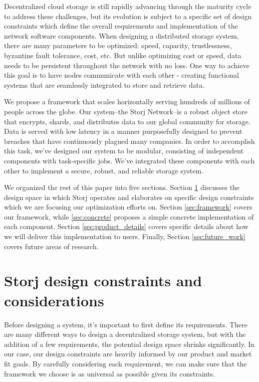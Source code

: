 \documentclass[11pt,fleqn,openany]{book}
\begin{document}
Decentralized cloud storage is still rapidly advancing through the maturity
cycle to address these challenges, but its evolution
is subject to a specific set of design constraints which
define the overall requirements and implementation of
the network software components. When designing a distributed storage system,
there are many parameters to be optimized: speed, capacity, trustlessness,
byzantine fault tolerance, cost, etc.
But unlike optimizing cost or speed, data needs to be persistent throughout
the network with no loss.
One way to achieve this goal is to have nodes communicate with each other -
creating functional systems that are seamlessly integrated to store
and retrieve data.

We propose a framework that scales horizontally serving hundreds of millions of
people across the globe. Our system--the Storj Network--is a robust object store
that encrypts, shards, and distributes data to our global community for storage.
Data is served with low latency in a manner purposefully designed to prevent
breaches that have continuously plagued many companies.
In order to accomplish this task, we've designed our system to be modular,
consisting of independent components with task-specific jobs.
We've integrated these components with each other to implement a secure,
robust, and reliable storage system.

We organized the rest of this paper into five
sections. Section \ref{sec:design_constraints} discusses the design space
in which Storj operates and elaborates on specific design constraints which
we are focusing our optimization efforts on.
Section \ref{sec:framework} covers our framework, while \ref{sec:concrete}
proposes a simple concrete implementation of each component.
Section \ref{sec:product_details} covers specific details
about how we will deliver this implementation to users. Finally, Section
\ref{sec:future_work} covers future areas of research.

\chapter{Storj design constraints and
considerations}\label{sec:design_constraints}

Before designing a system, it's important to first define its requirements.
There are many different ways to design a decentralized storage system, but
with the addition of a few requirements, the potential design space shrinks
significantly.
In our case, our design constraints are heavily informed by our product and
market fit goals.
By carefully considering each requirement, we can make sure that the framework
we choose is as universal as possible given its constraints.
\end{document}

